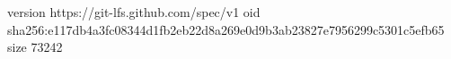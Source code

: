 version https://git-lfs.github.com/spec/v1
oid sha256:e117db4a3fc08344d1fb2eb22d8a269e0d9b3ab23827e7956299c5301c5efb65
size 73242
